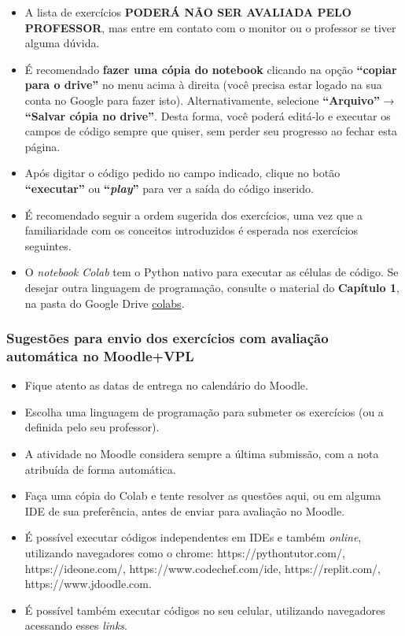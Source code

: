 \documentclass[12pt,a4paper]{article}
\providecommand{\tightlist}{%
      \setlength{\itemsep}{0pt}\setlength{\parskip}{0pt}}
\begin{document}
    \begin{itemize}
\tightlist
\item
  A lista de exercícios \textbf{PODERÁ NÃO SER AVALIADA PELO PROFESSOR},
  mas entre em contato com o monitor ou o professor se tiver alguma
  dúvida.
\item
  É recomendado \textbf{fazer uma cópia do notebook} clicando na opção
  \textbf{``copiar para o drive''} no menu acima à direita (você precisa
  estar logado na sua conta no Google para fazer isto).
  Alternativamente, selecione \textbf{``Arquivo''} → \textbf{``Salvar
  cópia no drive''}. Desta forma, você poderá editá-lo e executar os
  campos de código sempre que quiser, sem perder seu progresso ao fechar
  esta página.
\item
  Após digitar o código pedido no campo indicado, clique no botão
  \textbf{``executar''} ou \textbf{``\emph{play}''} para ver a saída do
  código inserido.
\item
  É recomendado seguir a ordem sugerida dos exercícios, uma vez que a
  familiaridade com os conceitos introduzidos é esperada nos exercícios
  seguintes.
\item
  O \emph{notebook Colab} tem o Python nativo para executar as células
  de código. Se desejar outra linguagem de programação, consulte o
  material do \textbf{Capítulo 1}, na pasta do Google Drive
  \href{https://drive.google.com/drive/folders/1YlFwv8XYN7PYYf-HwDMlkxzbmXzJw9cM?usp=sharing}{colabs}.
\end{itemize}

    \hypertarget{sugestuxf5es-para-envio-dos-exercuxedcios-com-avaliauxe7uxe3o-automuxe1tica-no-moodlevpl}{%
\subsubsection{Sugestões para envio dos exercícios com avaliação
automática no
Moodle+VPL}\label{sugestuxf5es-para-envio-dos-exercuxedcios-com-avaliauxe7uxe3o-automuxe1tica-no-moodlevpl}}

    \begin{itemize}
\tightlist
\item
  Fique atento as datas de entrega no calendário do Moodle.
\item
  Escolha uma linguagem de programação para submeter os exercícios (ou a
  definida pelo seu professor).
\item
  A atividade no Moodle considera sempre a última submissão, com a nota
  atribuída de forma automática.
\item
  Faça uma cópia do Colab e tente resolver as questões aqui, ou em
  alguma IDE de sua preferência, antes de enviar para avaliação no
  Moodle.
\item
  É possível executar códigos independentes em IDEs e também
  \emph{online}, utilizando navegadores como o chrome:
  https://pythontutor.com/, https://ideone.com/,
  https://www.codechef.com/ide, https://replit.com/,
  https://www.jdoodle.com.
\item
  É possível também executar códigos no seu celular, utilizando
  navegadores acessando esses \emph{links}.
\end{itemize}
\end{document}

